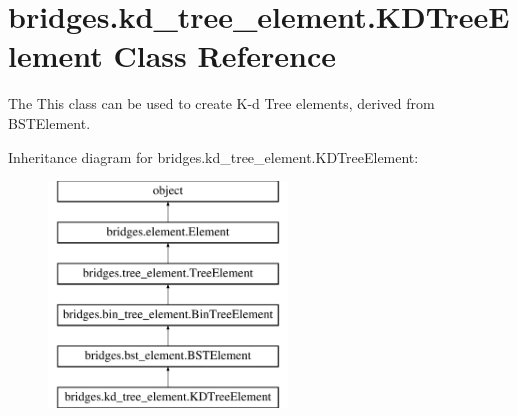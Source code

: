 \hypertarget{classbridges_1_1kd__tree__element_1_1_k_d_tree_element}{}\section{bridges.\+kd\+\_\+tree\+\_\+element.\+K\+D\+Tree\+Element Class Reference}
\label{classbridges_1_1kd__tree__element_1_1_k_d_tree_element}


The This class can be used to create K-\/d Tree elements, derived from B\+S\+T\+Element.  


Inheritance diagram for bridges.\+kd\+\_\+tree\+\_\+element.\+K\+D\+Tree\+Element\+:\begin{figure}[H]
\begin{center}
\leavevmode
\includegraphics[height=6.000000cm]{classbridges_1_1kd__tree__element_1_1_k_d_tree_element}
\end{center}
\end{figure}
